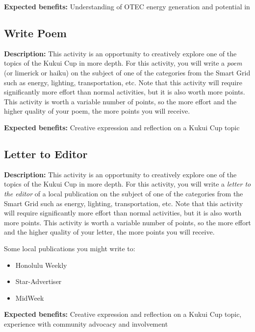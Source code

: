 \vspace{2ex}
\textbf{Expected benefits:} Understanding of OTEC energy generation and potential in \Hawaii


\subsection{Write Poem}

\textbf{Description:} This activity is an opportunity to creatively explore one of the topics of the Kukui Cup in more depth. For this activity, you will write a \emph{poem} (or limerick or haiku) on the subject of one of the categories from the Smart Grid such as energy, lighting, transportation, etc. Note that this activity will require significantly more effort than normal activities, but it is also worth more points. This activity is worth a variable number of points, so the more effort and the higher quality of your poem, the more points you will receive.

\vspace{2ex}
\textbf{Expected benefits:} Creative expression and reflection on a Kukui Cup topic


\subsection{Letter to Editor}

\textbf{Description:} This activity is an opportunity to creatively explore one of the topics of the Kukui Cup in more depth. For this activity, you will write a \emph{letter to the editor} of a local publication on the subject of one of the categories from the Smart Grid such as energy, lighting, transportation, etc. Note that this activity will require significantly more effort than normal activities, but it is also worth more points. This activity is worth a variable number of points, so the more effort and the higher quality of your letter, the more points you will receive.

Some local publications you might write to:

\begin{itemize}
	\item Honolulu Weekly
	\item Star-Advertiser
	\item MidWeek
\end{itemize}

\vspace{2ex}
\textbf{Expected benefits:} Creative expression and reflection on a Kukui Cup topic, experience with community advocacy and involvement


